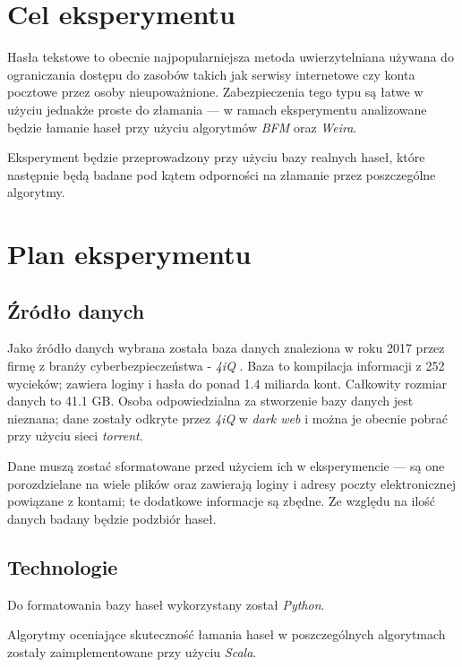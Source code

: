 \documentclass{article}
\begin{document}
	\section{Cel eksperymentu}
	Hasła tekstowe to obecnie najpopularniejsza metoda uwierzytelniana używana do ograniczania dostępu do zasobów takich jak serwisy internetowe czy konta pocztowe przez osoby nieupoważnione. Zabezpieczenia tego typu są łatwe w użyciu jednakże proste do złamania — w ramach eksperymentu analizowane będzie łamanie haseł przy użyciu algorytmów \textit{BFM} oraz \textit{Weira}.
	
	Eksperyment będzie przeprowadzony przy użyciu bazy realnych haseł, które następnie będą badane pod kątem odporności na złamanie przez poszczególne algorytmy.
	
	\section{Plan eksperymentu}
	\subsection{Źródło danych}
	Jako źródło danych wybrana została baza danych znaleziona w roku 2017 przez firmę z branży cyberbezpieczeństwa - \textit{4iQ} \cite{breach}. Baza to kompilacja informacji z 252 wycieków; zawiera loginy i hasła do ponad 1.4 miliarda kont. Całkowity rozmiar danych to 41.1 GB. Osoba odpowiedzialna za stworzenie bazy danych jest nieznana; dane zostały odkryte przez \textit{4iQ} w \textit{dark web} i można je obecnie pobrać przy użyciu sieci \textit{torrent}.
	
	Dane muszą zostać sformatowane przed użyciem ich w eksperymencie — są one porozdzielane na wiele plików oraz zawierają loginy i adresy poczty elektronicznej powiązane z kontami; te dodatkowe informacje są zbędne. Ze względu na ilość danych badany będzie podzbiór haseł.
	
	\subsection{Technologie}
	Do formatowania bazy haseł wykorzystany został \textit{Python}.
	
	Algorytmy oceniające skuteczność łamania haseł w poszczególnych algorytmach zostały zaimplementowane przy użyciu \textit{Scala}.
	
\end{document}
